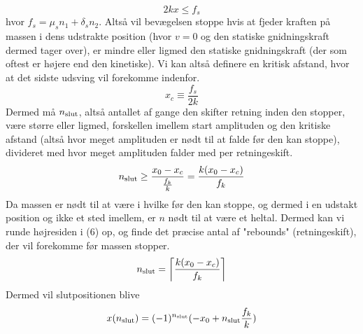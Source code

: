 \begin{equation*}
    2kx \leq f_s
\end{equation*}
hvor $f_s = \mu_s n_1 + \delta_s n_2$. Altså vil bevægelsen stoppe hvis at fjeder kraften på massen i dens udstrakte position (hvor $v = 0$ og den statiske gnidningskraft dermed tager over), 
er mindre eller ligmed den statiske gnidningskraft (der som oftest er højere end den kinetiske). Vi kan altså definere en kritisk afstand, hvor at det sidste udsving vil forekomme indenfor.
\begin{equation}
    x_c \equiv \frac{f_s}{2k}
\end{equation}
Dermed må $n_{\textup{slut}}$, altså antallet af gange den skifter retning inden den stopper, 
være større eller ligmed, forskellen imellem start amplituden og den kritiske afstand (altså hvor meget amplituden er nødt til at falde før den kan stoppe), divideret med hvor meget amplituden falder med per retningeskift.
\begin{equation}
    n_{\textup{slut}} \geq \frac{x_0 - x_c}{\frac{f_k}{k}} = \frac{k(x_0 - x_c)}{f_k}
\end{equation}
Da massen er nødt til at være i hvilke før den kan stoppe, og dermed i en udstakt position og ikke et sted imellem, er $n$ nødt til at være et heltal. 
Dermed kan vi runde højresiden i (6) op, og finde det præcise antal af "rebounds" (retningeskift), der vil forekomme før massen stopper.
\begin{equation}
    n_{\textup{slut}} = \left \lceil \frac{k(x_0 - x_c)}{f_k} \right \rceil
\end{equation}
Dermed vil slutpositionen blive
\begin{equation}
    x(n_{\textup{slut}}) = (-1)^{n_{\textup{slut}}} (-x_0 + n_{\textup{slut}} \frac{f_k}{k})
\end{equation}